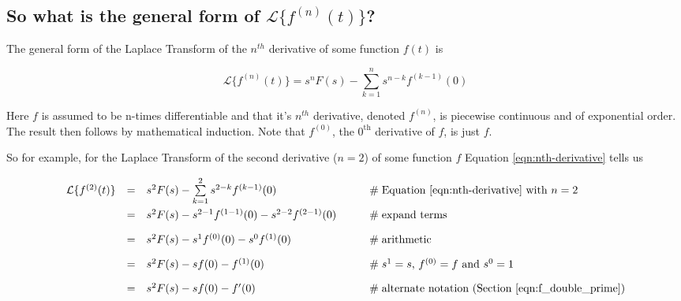 \documentclass{article}
\theoremstyle{definition}
\begin{document}
\smallskip
\subsection{So what is the general form of $\mathcal{L}\{f^{(n)}(t)\}$?}
\bigskip
\noindent
The general form of the Laplace Transform of the $n^{th}$
derivative of some function $f(t)$ is  

\bigskip
\begin{equation}
\mathcal{L}\{f^{(n)}(t)\} =  s^{n}F(s)- \sum_{k=1}^n s^{n-k} f^{(k-1)}(0)
\label{eqn:nth-derivative}
\end{equation}

\bigskip  
\noindent
Here $f$ is assumed to be n-times differentiable and that it's
$n^{th}$ derivative, denoted $f^{(n)}$, is piecewise continuous
and of exponential order. The result then follows by mathematical
induction. Note that $f^{(0)}$, the $0^{\text{th}}$ derivative of
$f$, is just $f$.

\bigskip
\noindent
So for example, for the Laplace Transform of the second
derivative ($n = 2$) of some function $f$ Equation
\ref{eqn:nth-derivative} tells us

\begin{equation*}
\begin{array}{lllll}
\mathcal{L}\{f^{(2)}(t)\}  
&=&  s^{2}F(s)- \sum\limits_{k=1}^2 s^{2-k} f^{(k-1)}(0)                                         &\qquad \mathrel{\#} \text{Equation \ref{eqn:nth-derivative} with $n = 2$}               \\
[10pt]
&=&  s^{2}F(s)- s^{2-1}f^{(1-1)}(0)  - s^{2-2}f^{(2-1)}(0)                                         &\qquad \mathrel{\#} \text{expand terms}                                                                  \\
[10pt]
&=&  s^{2}F(s)- s^{1}f^{(0)}(0)  - s^0f^{(1)}(0)                                                        &\qquad \mathrel{\#} \text{arithmetic}                                                                        \\
[10pt]
&=&  s^{2}F(s)- sf(0)  - f^{(1)}(0)                                                                            &\qquad \mathrel{\#} \text{$s^1 = s$, $f^{(0)} = f$ and $s^0 = 1$}                             \\
[10pt]
&=& s^{2}F(s)- sf(0)  - f^{\prime}(0)                                                                       &\qquad \mathrel{\#} \text{alternate notation (Section \ref{eqn:f_double_prime})}
\end{array}
\end{equation*}
\end{document}
